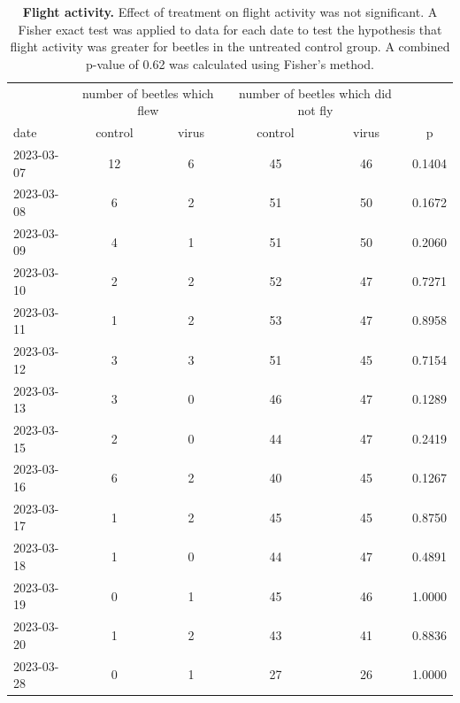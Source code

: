 \documentclass[12pt,letterpaper,english,bibliography=totocnumbered, abstract=on]{scrartcl}
\begin{document}
\begin{table}[H]
	\centering
	\caption{\textbf{Flight activity.} Effect of treatment on flight activity was not significant. A Fisher exact test was applied to data for each date to test the hypothesis that flight activity was greater for beetles in the untreated control group. A combined p-value of 0.62 was calculated using Fisher's method.}
	\label{ornv detection}
	\begin{tabular}{l cc cc c}
		\toprule
		& \multicolumn{2}{c}{number of beetles which flew} & \multicolumn{2}{c}{number of beetles which did not fly} & \\
		\cmidrule(lr){2-3} \cmidrule(lr){4-5}		
		date       &  control         &  virus         &  control           &  virus           & p        \\
		\midrule
		2023-03-07 &               12 &              6 &                 45 &               46 & 0.1404 \\
		2023-03-08 &                6 &              2 &                 51 &               50 & 0.1672 \\
		2023-03-09 &                4 &              1 &                 51 &               50 & 0.2060 \\
		2023-03-10 &                2 &              2 &                 52 &               47 & 0.7271 \\
		2023-03-11 &                1 &              2 &                 53 &               47 & 0.8958 \\
		2023-03-12 &                3 &              3 &                 51 &               45 & 0.7154 \\
		2023-03-13 &                3 &              0 &                 46 &               47 & 0.1289 \\
		2023-03-15 &                2 &              0 &                 44 &               47 & 0.2419 \\
		2023-03-16 &                6 &              2 &                 40 &               45 & 0.1267 \\
		2023-03-17 &                1 &              2 &                 45 &               45 & 0.8750 \\
		2023-03-18 &                1 &              0 &                 44 &               47 & 0.4891 \\
		2023-03-19 &                0 &              1 &                 45 &               46 & 1.0000 \\
		2023-03-20 &                1 &              2 &                 43 &               41 & 0.8836 \\
		2023-03-28 &                0 &              1 &                 27 &               26 & 1.0000 \\
		\bottomrule
	\end{tabular}
\end{table}
\end{document}
